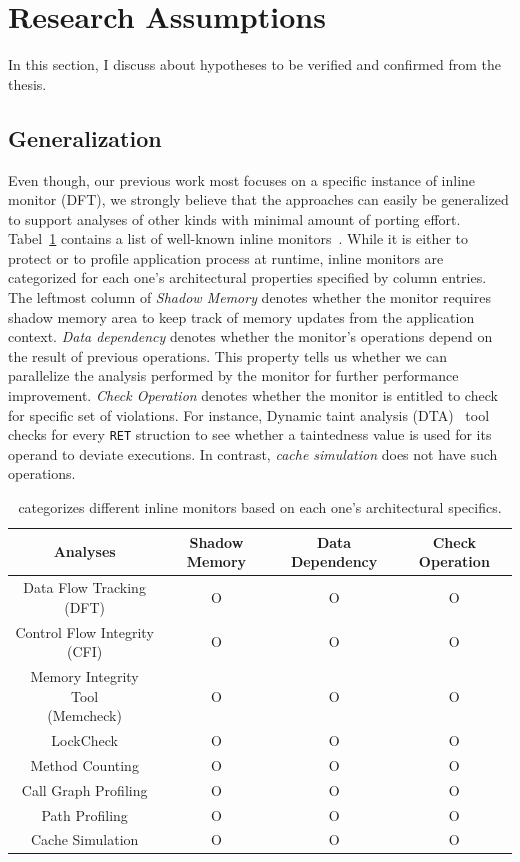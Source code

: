 \section{Research Assumptions} \label{sec:hypo} 

In this section, I discuss about hypotheses to be verified and confirmed
from the thesis.

\subsection{\sreplica Generalization}

Even though, our previous work most focuses on a specific instance of inline
monitor (\ie DFT), we strongly believe that the approaches can easily be
generalized to support analyses of other kinds with minimal amount of porting
effort. Tabel~\ref{tab:analyses} contains a list of well-known inline
monitors~\cite{cab:oopsala2009}. While it is either to protect or to profile
application process at runtime, inline monitors are categorized for each one's
architectural properties specified by column entries.  The leftmost column of
{\it Shadow Memory} denotes whether the monitor requires shadow memory area to
keep track of memory updates from the application context. {\it Data
dependency} denotes whether the monitor's operations depend on the result of
previous operations. This property tells us whether we can parallelize the
analysis performed by the monitor for further performance improvement. {\it
Check Operation} denotes whether the monitor is entitled to check for specific
set of violations. For instance, Dynamic taint analysis
(DTA)~\cite{taintcheck:ndss2005} tool checks for every {\tt RET} struction to
see whether a taintedness value is used for its operand to deviate executions.
In contrast, {\it cache simulation} does not have such operations.

\begin{table}[h]
    \centering
\begin{tabular}{|c|c|c|c|}
\hline
Analyses & Shadow Memory & Data Dependency & Check Operation \\ 
\hline \hline
Data Flow Tracking (DFT) & O & O & O \\ \hline
Control Flow Integrity (CFI) & O & O & O \\ \hline
\specialcell{Memory Integrity Tool \\ (Memcheck)} & O & O & O \\ \hline
LockCheck & O & O & O \\ \hline
Method Counting & O & O & O \\ \hline
Call Graph Profiling & O & O & O \\ \hline
Path Profiling & O & O & O \\ \hline
Cache Simulation & O & O & O \\ \hline
\end{tabular}
\caption{ categorizes different inline monitors based on each one's
architectural specifics. \label{tab:analyses}}
\end{table}

